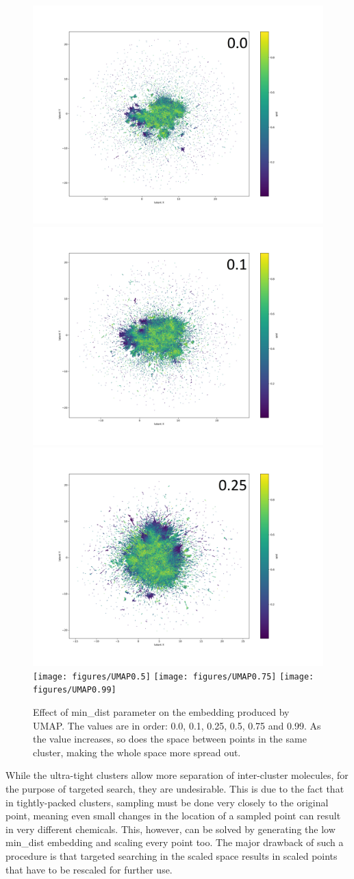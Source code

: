 \begin{figure}[!h]
	\centering
	\includegraphics[width=0.49\columnwidth]{figures/UMAP0.0}
	\includegraphics[width=0.49\columnwidth]{figures/UMAP0.1}
	\includegraphics[width=0.49\columnwidth]{figures/UMAP0.25}
	\texttt{[image: figures/UMAP0.5]}
	\texttt{[image: figures/UMAP0.75]}
	\texttt{[image: figures/UMAP0.99]}
	\caption{Effect of min\_dist parameter on the embedding produced by UMAP. The values are in order: 0.0, 0.1, 0.25, 0.5, 0.75 and 0.99. As the value increases, so does the space between points in the same cluster, making the whole space more spread out.}
	\label{fig:umap:min_dist}
\end{figure}

While the ultra-tight clusters allow more separation of inter-cluster molecules, for the purpose of targeted search, they are undesirable. This is due to the fact that in tightly-packed clusters, sampling must be done very closely to the original point, meaning even small changes in the location of a sampled point can result in very different chemicals. This, however, can be solved by generating the low min\_dist embedding and scaling every point too. The major drawback of such a procedure is that targeted searching in the scaled space results in scaled points that have to be rescaled for further use.

